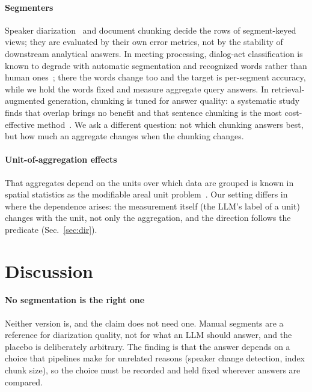 \documentclass[conference]{IEEEtran}
\begin{document}
\paragraph*{Segmenters} Speaker diarization~\cite{pyannote} and document chunking decide the rows of segment-keyed
views; they are evaluated by their own error metrics, not by the stability of downstream analytical answers. In
meeting processing, dialog-act classification is known to degrade with automatic segmentation and recognized words
rather than human ones~\cite{angdialog}; there the words change too and the target is per-segment accuracy, while we
hold the words fixed and measure aggregate query answers. In
retrieval-augmented generation, chunking is tuned for answer quality: a systematic study finds that overlap brings no
benefit and that sentence chunking is the most cost-effective method~\cite{chunkqa}. We ask a different question:
not which chunking answers best, but how much an aggregate changes when the chunking changes.
\paragraph*{Unit-of-aggregation effects} That aggregates depend on the units over which data are grouped is known in
spatial statistics as the modifiable areal unit problem~\cite{maup}. Our setting differs in where the dependence
arises: the measurement itself (the LLM's label of a unit) changes with the unit, not only the aggregation, and the
direction follows the predicate (Sec.~\ref{sec:dir}).

\section{Discussion}\label{sec:disc}
\paragraph*{No segmentation is the right one} Neither version is, and the claim does not need one. Manual segments are a reference for
diarization quality, not for what an LLM should answer, and the placebo is deliberately arbitrary. The finding is that
the answer depends on a choice that pipelines make for unrelated reasons (speaker change detection, index chunk size),
so the choice must be recorded and held fixed wherever answers are compared.
\end{document}
